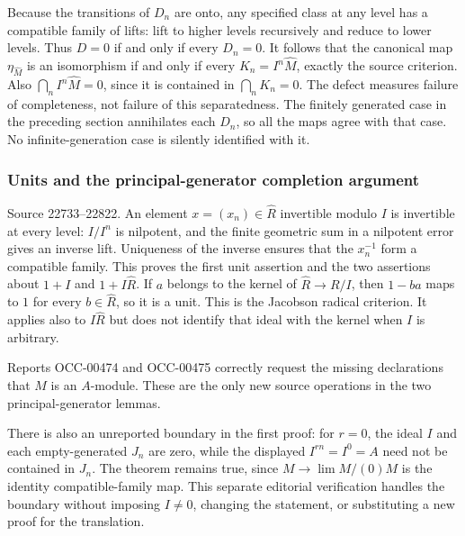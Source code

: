 Because the transitions of \(D_n\) are onto, any specified class at any level has a compatible family of lifts: lift to higher levels recursively and reduce to lower levels. Thus \(D=0\) if and only if every \(D_n=0\). It follows that the canonical map \(\eta_{\widehat M}\) is an isomorphism if and only if every \(K_n=I^n\widehat M\), exactly the source criterion. Also \(\bigcap_n I^n\widehat M=0\), since it is contained in \(\bigcap_nK_n=0\). The defect measures failure of completeness, not failure of this separatedness. The finitely generated case in the preceding section annihilates each \(D_n\), so all the maps agree with that case. No infinite-generation case is silently identified with it.

\subsubsection{Units and the principal-generator completion argument}\label{algebra-proof-014-units-and-the-principal-generator-completion-argument}

Source 22733--22822. An element \(x=(x_n)\in\widehat R\) invertible modulo \(I\) is invertible at every level: \(I/I^n\) is nilpotent, and the finite geometric sum in a nilpotent error gives an inverse lift. Uniqueness of the inverse ensures that the \(x_n^{-1}\) form a compatible family. This proves the first unit assertion and the two assertions about \(1+I\) and \(1+I\widehat R\). If \(a\) belongs to the kernel of \(\widehat R\to R/I\), then \(1-ba\) maps to \(1\) for every \(b\in\widehat R\), so it is a unit. This is the Jacobson radical criterion. It applies also to \(I\widehat R\) but does not identify that ideal with the kernel when \(I\) is arbitrary.

Reports OCC-00474 and OCC-00475 correctly request the missing declarations that \(M\) is an \(A\)-module. These are the only new source operations in the two principal-generator lemmas.

There is also an unreported boundary in the first proof: for \(r=0\), the ideal \(I\) and each empty-generated \(J_n\) are zero, while the displayed \(I^{rn}=I^0=A\) need not be contained in \(J_n\). The theorem remains true, since \(M\to\lim M/(0)M\) is the identity compatible-family map. This separate editorial verification handles the boundary without imposing \(I\ne0\), changing the statement, or substituting a new proof for the translation.

